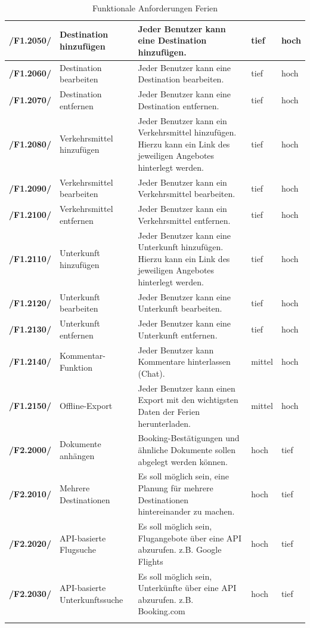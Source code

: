 \documentclass[10pt,a4paper,titlepage,twoside,german,final]{zhawreprt}
\newcommand{\AddRequirement}[2]{
\textbf{/#1#2/}
}
\newcommand{\F}[1]{
\AddRequirement{F1.}{#1}
}
\newcommand{\W}[1]{
\AddRequirement{F2.}{#1}
}
\numberwithin{table}{chapter}
\begin{document}
\begin{center}
\begin{longtable}{l|p{2.5cm}|p{5cm}|p{2cm}|p{1.5cm}}
\F{2050} & Destination hinzufügen & Jeder Benutzer kann eine Destination hinzufügen. & tief & hoch\\\hline
\F{2060} & Destination bearbeiten & Jeder Benutzer kann eine Destination bearbeiten. & tief & hoch\\\hline
\F{2070} & Destination entfernen & Jeder Benutzer kann eine Destination entfernen. & tief & hoch\\\hline
\F{2080} & Verkehrsmittel hinzufügen & Jeder Benutzer kann ein Verkehrsmittel hinzufügen. Hierzu kann ein Link des jeweiligen Angebotes hinterlegt werden. & tief & hoch\\\hline
\F{2090} & Verkehrsmittel bearbeiten & Jeder Benutzer kann ein Verkehrsmittel bearbeiten. & tief & hoch\\\hline
\F{2100} & Verkehrsmittel entfernen & Jeder Benutzer kann ein Verkehrsmittel entfernen. & tief & hoch\\\hline
\F{2110} & Unterkunft hinzufügen & Jeder Benutzer kann eine Unterkunft hinzufügen. Hierzu kann ein Link des jeweiligen Angebotes hinterlegt werden. & tief & hoch\\\hline
\F{2120} & Unterkunft bearbeiten & Jeder Benutzer kann eine Unterkunft bearbeiten. & tief & hoch\\\hline
\F{2130} & Unterkunft entfernen & Jeder Benutzer kann eine Unterkunft entfernen. & tief & hoch\\\hline
\F{2140} & Kommentar-Funktion & Jeder Benutzer kann Kommentare hinterlassen (Chat). & mittel & hoch\\\hline
\F{2150} & Offline-Export & Jeder Benutzer kann einen Export mit den wichtigsten Daten der Ferien herunterladen. & mittel & hoch\\\hline
\W{2000} & Dokumente anhängen & Booking-Bestätigungen und ähnliche Dokumente sollen abgelegt werden können. & hoch & tief\\\hline
\W{2010} & Mehrere Destinationen & Es soll möglich sein, eine Planung für mehrere Destinationen hintereinander zu machen. & hoch & tief\\\hline
\W{2020} & API-basierte Flugsuche & Es soll möglich sein, Flugangebote über eine API abzurufen. z.B. Google Flights & hoch & tief\\\hline
\W{2030} & API-basierte Unterkunftssuche & Es soll möglich sein, Unterkünfte über eine API abzurufen. z.B. Booking.com & hoch & tief\\\hline
\caption{Funktionale Anforderungen Ferien}\label{tbl:FuncVacation}
\end{longtable}
\end{center}\newpage
\end{document}
